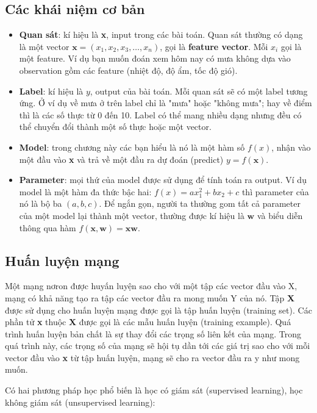 \subsection{Các khái niệm cơ bản}
\begin{itemize}
	\item \textbf{Quan sát}: kí hiệu là \textbf{x}, input trong các bài toán. Quan sát thường có dạng là một vector $\textbf{x}=(x_1,x_2,x_3,\ldots, x_n)$, gọi là \textbf{feature vector}. Mỗi $x_i$ gọi là một feature. Ví dụ bạn muốn đoán xem hôm nay có mưa không dựa vào observation gồm các feature (nhiệt độ, độ ẩm, tốc độ gió).	
\item \textbf{Label}: kí hiệu là $y$, output của bài toán. Mỗi quan sát sẽ có một label tương ứng. Ở ví dụ về mưa ở trên label chỉ là "mưa" hoặc "không mưa"; hay về điểm thì là các số thực từ 0 đến 10. Label có thể mang nhiều dạng nhưng đều có thể chuyển đổi thành một số thực hoặc một vector. 
\item \textbf{Model}: trong chương này các bạn hiểu là nó là một hàm số $f(x)$, nhận vào một đầu vào \textbf{x} và trả về một đầu ra dự đoán (predict) $y=f(\textbf{x})$.
\item \textbf{Parameter}: mọi thứ của model được sử dụng để tính toán ra output. Ví dụ model là một hàm đa thức bậc hai: $f(x) = ax_1^2 + bx_2 + c$ thì parameter của nó là bộ ba $(a,b,c)$. Để ngắn gọn, người ta thường gom tất cả parameter của một model lại thành một vector, thường được kí hiệu là $\textbf{w}$ và biểu diễn thông qua hàm $f(\textbf{x},\textbf{w}) = \textbf{x}\textbf{w}$.

\end{itemize}
\subsection{Huấn luyện mạng}
\hspace{5mm} Một mạng nơron được huyấn luyện sao cho với một tập các vector đầu vào
X, mạng có khả năng tạo ra tập các vector đầu ra mong muốn Y của nó. Tập \textbf{X} được sử dụng cho huấn luyện mạng được gọi là tập huấn luyện (training set). Các phần tử \textbf{x} thuộc \textbf{X} được gọi là các mẫu huấn luyện (training example). Quá trình huấn luyện bản chất là sự thay đổi các trọng số liên kết của mạng. Trong quá trình này, các trọng số của mạng sẽ hội tụ dần tới các giá trị sao cho với mỗi vector đầu vào \textbf{x} từ tập huấn luyện, mạng sẽ cho ra vector đầu ra y như mong muốn.\par
Có hai phương pháp học phổ biến là học có giám sát (supervised learning), học không giám sát (unsupervised learning):


